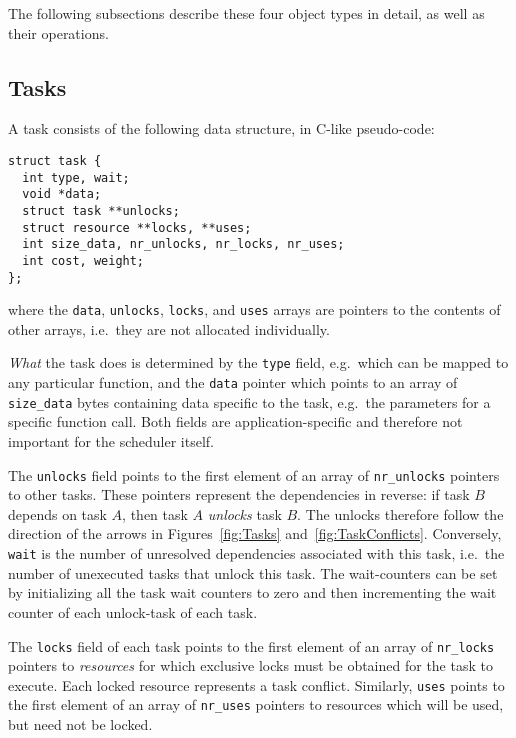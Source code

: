 \documentclass[fleqn,10pt]{wlpeerj}
\newcommand{\figs}[2]
    {Figures~\ref{fig:#1} and~\ref{fig:#2}}
\begin{document}
The following subsections describe these four object types
in detail, as well as their operations.


\subsection{Tasks}
\label{sec:tasks}

A task consists of the following data structure, in C-like pseudo-code:

\begin{center}\begin{minipage}{0.9\textwidth}
    \begin{lstlisting}
struct task {
  int type, wait;
  void *data;
  struct task **unlocks;
  struct resource **locks, **uses;
  int size_data, nr_unlocks, nr_locks, nr_uses;
  int cost, weight;
};
    \end{lstlisting}
\end{minipage}\end{center}
\noindent where the {\tt data}, {\tt unlocks}, {\tt locks},
and {\tt uses} arrays are pointers to the contents of other
arrays, i.e.~they are not allocated individually.

{\em What} the task does is determined by the {\tt type}
field, e.g.~which can be mapped to any particular function,
and the {\tt data} pointer which points to an array of
{\tt size\_data} bytes containing data specific to the task,
e.g.~the parameters for a specific function call.
Both fields are application-specific and therefore not
important for the scheduler itself.

The {\tt unlocks} field points to the first element of
an array of {\tt nr\_unlocks} pointers to other tasks.
These pointers represent the dependencies in reverse:
if task $B$ depends on task $A$, then task $A$ {\em unlocks}
task $B$.
The unlocks therefore follow the direction of the arrows
in \figs{Tasks}{TaskConflicts}.
Conversely, {\tt wait} is the number of unresolved dependencies
associated with this task, i.e.~the number of unexecuted tasks
that unlock this task.
The wait-counters can
be set by initializing all the task wait counters to zero and then
incrementing the wait counter of each unlock-task of each task.

The {\tt locks} field of each task points to the first element of
an array of {\tt nr\_locks} pointers to {\em resources}
for which exclusive locks must be obtained for the task
to execute.
Each locked resource represents a task conflict.
Similarly, {\tt uses} points to the first element of
an array of {\tt nr\_uses} pointers to resources which
will be used, but need not be locked.
\end{document}
